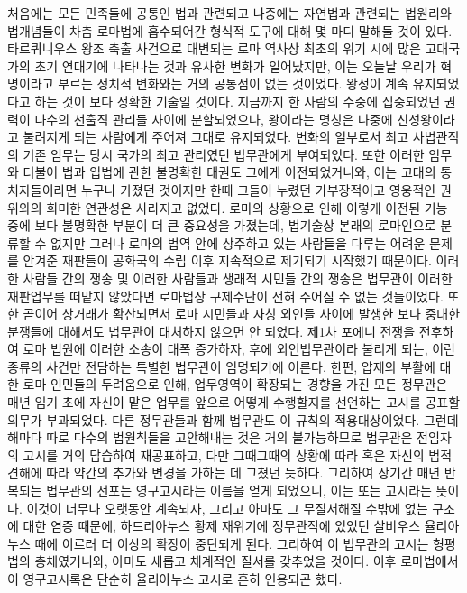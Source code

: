 처음에는 모든 민족들에 공통인 법과 관련되고 나중에는 자연법과 관련되는
법원리와 법개념들이 차츰 로마법에 흡수되어간 형식적 도구에 대해
몇 마디 말해둘 것이 있다.
타르퀴니우스 왕조 축출 사건으로 대변되는 로마 역사상 최초의 위기 시에
많은 고대국가의 초기 연대기에 나타나는 것과 유사한 변화가 일어났지만,
이는 오늘날 우리가 혁명이라고 부르는 정치적 변화와는 거의 공통점이 없는
것이었다.
왕정이 계속 유지되었다고 하는 것이 보다 정확한 기술일 것이다.
지금까지 한 사람의 수중에 집중되었던 권력이
다수의 선출직 관리들 사이에 분할되었으나,
왕이라는 명칭은 나중에 신성왕이라고
불려지게 되는 사람에게 주어져 그대로 유지되었다.
변화의 일부로서 최고 사법관직의 기존 임무는 당시 국가의 최고 관리였던
법무관에게 부여되었다. 또한
이러한 임무와 더불어
법과 입법에 관한 불명확한 대권도 그에게 이전되었거니와,
이는 고대의 통치자들이라면 누구나 가졌던 것이지만
한때 그들이 누렸던 가부장적이고 영웅적인 권위와의 희미한 연관성은
사라지고 없었다.
로마의 상황으로 인해 이렇게 이전된 기능 중에 보다 불명확한 부분이
더 큰 중요성을 가졌는데,
법기술상 본래의 로마인으로 분류할 수 없지만
그러나 로마의 법역 안에 상주하고 있는 사람들을 다루는 어려운 문제를
안겨준 재판들이
공화국의 수립 이후
지속적으로 제기되기 시작했기 때문이다.
이러한 사람들 간의 쟁송 및 이러한 사람들과 생래적 시민들 간의 쟁송은
법무관이 이러한 재판업무를 떠맡지 않았다면
로마법상 구제수단이 전혀 주어질 수 없는 것들이었다.
또한 곧이어 상거래가 확산되면서 로마 시민들과 자칭 외인들 사이에 발생한
보다 중대한 분쟁들에 대해서도 법무관이 대처하지 않으면 안 되었다.
제1차 포에니 전쟁을 전후하여 로마 법원에 이러한 소송이 대폭 증가하자,
후에 외인법무관이라 불리게 되는,
이런 종류의 사건만 전담하는 특별한 법무관이 임명되기에 이른다.
한편, 압제의 부활에 대한 로마 인민들의 두려움으로 인해,
업무영역이 확장되는 경향을 가진 모든 정무관은
매년 임기 초에
자신이 맡은 업무를 앞으로 어떻게 수행할지를 선언하는
고시를 공표할 의무가 부과되었다.
다른 정무관들과 함께 법무관도 이 규칙의 적용대상이었다.
그런데 해마다 따로 다수의 법원칙들을 고안해내는 것은 거의 불가능하므로
법무관은 전임자의 고시를 거의 답습하여 재공표하고,
다만 그때그때의 상황에 따라 혹은 자신의 법적 견해에 따라
약간의 추가와 변경을 가하는 데 그쳤던 듯하다.
그리하여 장기간 매년 반복되는 법무관의 선포는
영구고시라는 이름을 얻게 되었으니,
이는  또는  고시라는 뜻이다.
이것이 너무나 오랫동안 계속되자,
그리고 아마도 그 무질서해질 수밖에 없는 구조에 대한 염증 때문에,
하드리아누스 황제 재위기에 정무관직에 있었던
살비우스 율리아누스 때에 이르러
더 이상의 확장이 중단되게 된다.
그리하여 이 법무관의 고시는 형평법의 총체였거니와,
아마도 새롭고 체계적인 질서를 갖추었을 것이다.
이후 로마법에서 이 영구고시록은 단순히
율리아누스 고시로 흔히 인용되곤 했다.







